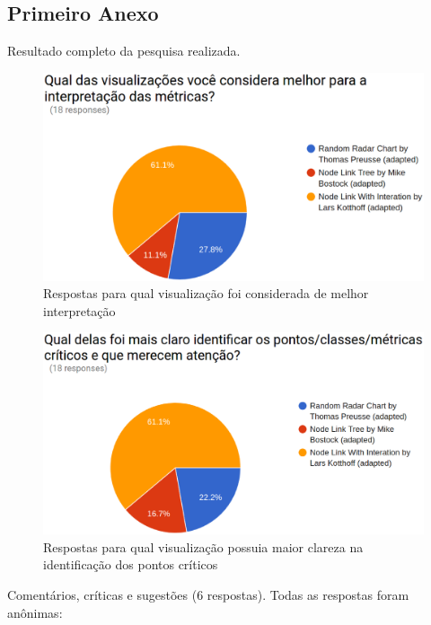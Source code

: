 \begin{anexosenv}

\partanexos

\chapter{Primeiro Anexo}
\label{chap:anexoA}

Resultado completo da pesquisa realizada.

\begin{figure}[!htb]
	\centering
    \includegraphics[keepaspectratio=true,scale=0.35]
    {figuras/res1.eps}
  \caption{Respostas para qual visualização foi considerada de melhor
  interpretação}
  \label{fig:res1}
\end{figure}

\begin{figure}[!htb]
	\centering
    \includegraphics[keepaspectratio=true,scale=0.35]
    {figuras/res2.eps}
  \caption{Respostas para qual visualização possuia maior clareza na
  identificação dos pontos críticos}
  \label{fig:res1}
\end{figure}

Comentários, críticas e sugestões (6 respostas). Todas as respostas foram
anônimas:


\end{anexosenv}
